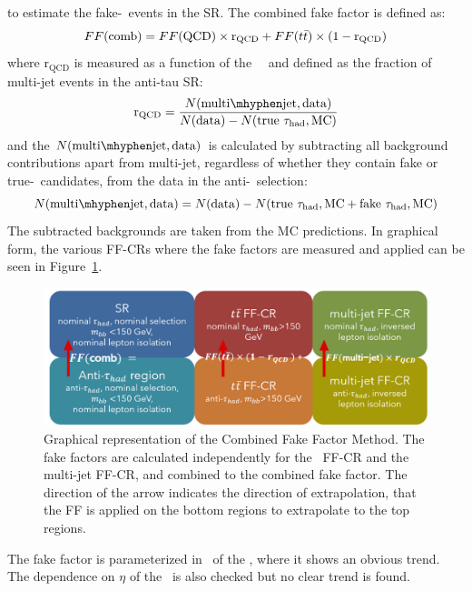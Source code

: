 to estimate the fake-\tauhad\ events in the SR.
The combined fake factor is defined as:
\begin{equation}
FF(\mathrm{comb}) = FF(\mathrm{QCD}) \times \mathrm{r}_{\mathrm{QCD}} + FF(t\bar{t}) \times (1 - \mathrm{r}_{\mathrm{QCD}}) 
\end{equation} 
where $\mathrm{r}_{\mathrm{QCD}}$ is measured as a function of the \tauhad\ \pT\ 
and defined as the fraction of multi-jet events in the anti-tau SR:
\begin{equation}
\mathrm{r}_{\mathrm{QCD}} = \frac{N(\mathrm{multi\mhyphen jet, data})} {N(\mathrm{data}) - N(\mathrm{true}~\tauhad, \mathrm{MC})}
\end{equation} 
and the $N(\mathrm{multi\mhyphen jet, data})$ is calculated by 
subtracting all background contributions apart from multi-jet, 
regardless of whether they contain fake or true-\tauhad\ candidates, 
from the data in the anti-\tauhad\ selection:
\begin{equation}
	N(\mathrm{multi\mhyphen jet, data}) = N(\mathrm{data}) - N(\mathrm{true}~\tauhad, \mathrm{MC} + \mathrm{fake}~\tauhad, \mathrm{MC})
\end{equation}  
The subtracted backgrounds are taken from the MC predictions. 
In graphical form, the various FF-CRs 
where the fake factors are measured and applied can be seen in Figure~\ref{fig:CombFFMethod}.
\begin{figure}[htbp]
\centering
\includegraphics[width=.9\textwidth]{DiHiggs/plots/FF regions.png}
\caption{Graphical representation of the Combined Fake Factor Method. 
The fake factors are calculated independently for the \ttbar\ FF-CR and the multi-jet FF-CR, and 
combined to the combined fake factor. 
The direction of the arrow indicates the direction 
of extrapolation, 
that the FF is applied on the bottom regions to extrapolate to the top regions.}
\label{fig:CombFFMethod}
\end{figure}
The fake factor is parameterized in \pt\ of the \tauhad, where it shows an obvious trend.
The dependence on $\eta$ of the \tauhad\ is also checked but no clear trend is found.



